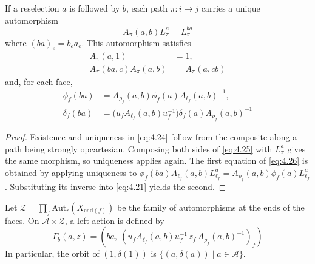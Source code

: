 \begin{lemma}\label{lem:4.21}

If a reselection $a$ is followed by $b$, each path $\pi:i\to j$ carries a unique
automorphism
\begin{equation*}
A_\pi(a,b)L_\pi^a=L_\pi^{ba}
\tag{4.24}\label{eq:4.24}
\end{equation*}
where $(ba)_e=b_ea_e$.
This automorphism satisfies
\begin{equation*}
\begin{aligned}
A_\pi(a,1)&=1,\\
A_\pi(ba,c)A_\pi(a,b)&=A_\pi(a,cb)
\end{aligned}
\tag{4.25}\label{eq:4.25}
\end{equation*}
and, for each face,
\begin{equation*}
\begin{aligned}
\phi_f(ba)
 &=A_{\rho_f}(a,b)\phi_f(a)A_{\ell_f}(a,b)^{-1},\\
\delta_f(ba)
 &=\bigl(u_fA_{\ell_f}(a,b)u_f^{-1}\bigr)
   \delta_f(a)A_{\rho_f}(a,b)^{-1}
\end{aligned}
\tag{4.26}\label{eq:4.26}
\end{equation*}
\end{lemma}

\begin{proof}

Existence and uniqueness in \eqref{eq:4.24} follow from the composite along a path being
strongly opcartesian.
Composing both sides of \eqref{eq:4.25} with $L_\pi^a$ gives the same morphism, so
uniqueness applies again.
The first equation of \eqref{eq:4.26} is obtained by applying uniqueness to
$\phi_f(ba)A_{\ell_f}(a,b)L_{\ell_f}^a=A_{\rho_f}(a,b)\phi_f(a)L_{\ell_f}^a$.
Substituting its inverse into \eqref{eq:4.21} yields the second.

\end{proof}

\begin{proposition}\label{prop:4.22}

Let $\mathcal{Z}=\prod_f\mathrm{Aut}_r(X_{\mathrm{end}(f)})$ be the family of
automorphisms at the ends of the faces.
On $\mathcal{A}\times \mathcal{Z}$, a left action is defined by
\begin{equation*}
\Gamma_b(a,z)=
\left(ba,\
\left(
u_fA_{\ell_f}(a,b)u_f^{-1}\,
z_f\,A_{\rho_f}(a,b)^{-1}
\right)_f\right)
\tag{4.27}\label{eq:4.27}
\end{equation*}
In particular, the orbit of $(1,\delta(1))$ is
$\{(a,\delta(a))\mid a\in \mathcal{A}\}$.

\end{proposition}

